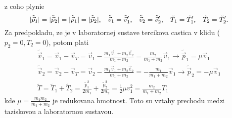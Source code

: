 \documentclass[../../main.tex]{subfiles}
\begin{document}
z coho plynie $$ \lvert \tilde{\vec{p}}_1 \rvert=\lvert \tilde{\vec{p}}_2 \rvert=\lvert \tilde{\vec{p}}_1 \rvert=\lvert \tilde{\vec{p}}_2  \rvert, \hspace{0.3cm} \tilde{\vec{v}}_1=\tilde{\vec{v}}_1^{\prime}, \hspace{0.3cm} \tilde{\vec{v}}_2=\tilde{\vec{v}}_2^{\prime}, \hspace{0.3cm} \tilde{T}_1=\tilde{T}_1^{\prime}, \hspace{0.3 cm} \tilde{T}_2=\tilde{T}_2^{\prime}. $$
Za predpokladu, ze je v laboratornej sustave tercikova castica v klidu ($p_2=0, T_2=0$), potom plati
\begin{equation}
\begin{gathered}
\tilde{\vec{v}}_1=\vec{v}_1-\vec{v}_T=\vec{v}_1-\frac{m_1\vec{v}_1+m_2\vec{v}_2}{m_1+m_2}=\frac{m_2}{m_1+m_2}\vec{v}_1\rightarrow \tilde{\vec{p}}_1=\mu \vec{v}_1 \\
\tilde{\vec{v}}_2=\vec{v}_2-\vec{v}_T=\vec{v}_2-\frac{m_1\vec{v}_1+m_2\vec{v}_2}{m_1+m_2}=-\frac{m_1}{m_1+m_2}\vec{v}_1\rightarrow \tilde{\vec{p}}_2=-\mu \vec{v}_1 \\
\tilde{T}=\tilde{T}_1+\tilde{T}_2=\frac{\tilde{p}_1^2}{2m_1}+\frac{\tilde{p}_2^2}{2m_2}=\frac{1}{2}\mu v_1^2=\frac{m_2}{m_1+m_2}T_1
\end{gathered}
\end{equation}
kde $\mu=\frac{m_1m_2}{m_1+m_2}$ je redukovana hmotnost. Toto su vztahy prechodu medzi taziskovou a laboratornou sustavou.
\end{document}
